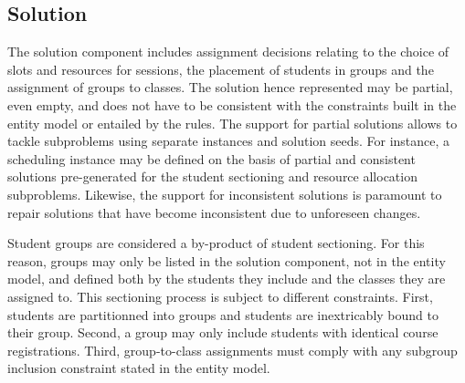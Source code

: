 \subsection{Solution}
\label{sec:solution}

The solution component includes assignment decisions
relating to the choice of slots and resources for sessions,
the placement of students in groups and
the assignment of groups to classes.
The solution hence represented may be partial, even empty,
and does not have to be consistent with the constraints built in the entity model or entailed by the rules.
The support for partial solutions allows to tackle subproblems using separate {\UTP} instances and solution seeds.
For instance, a scheduling instance may be defined on the basis of partial and consistent solutions pre-generated for the student sectioning and resource allocation subproblems.
Likewise, the support for inconsistent solutions is paramount to repair solutions that have become inconsistent due to unforeseen changes.

Student groups are considered a by-product of student sectioning.
For this reason, groups may only be listed in the solution component, not in the entity model, and defined both by the students they include and the classes they are assigned to. 
This sectioning process is subject to different constraints. 
First, students are partitionned into groups and students are inextricably bound to their group.
Second, a group may only include students with identical course registrations.
Third, group-to-class assignments must comply with any subgroup inclusion constraint stated in the entity model.




